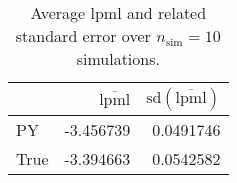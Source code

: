\begin{table}[H]

\caption{Average lpml and related standard error over $n_{\text{sim}} = 10$ simulations.}
\centering
\begin{tabular}[t]{lrr}
\toprule
  & $\overbar{\text{lpml}}$ & $\text{sd}(\overbar{\text{lpml}})$\\
\midrule
PY & -3.456739 & 0.0491746\\
True & -3.394663 & 0.0542582\\
\bottomrule
\end{tabular}
\end{table}